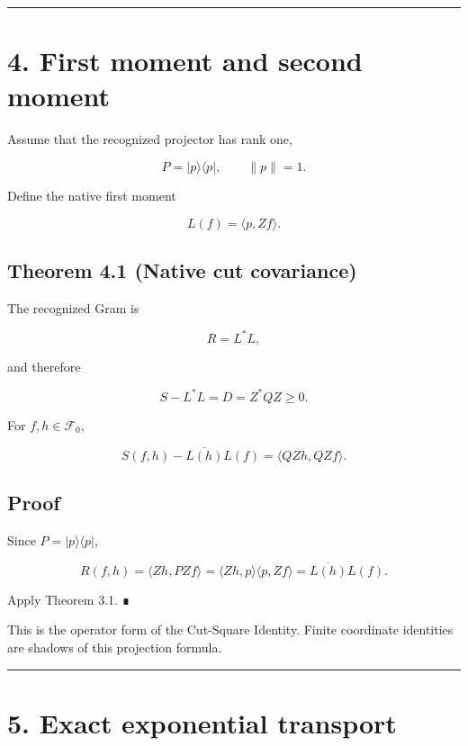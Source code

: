 \begin{center}\rule{0.5\linewidth}{0.5pt}\end{center}

\hypertarget{first-moment-and-second-moment}{%
\section{4. First moment and second moment}\label{first-moment-and-second-moment}}

Assume that the recognized projector has rank one,

\[
P=|p\rangle\langle p|,
\qquad
\|p\|=1.
\]

Define the native first moment

\[
L(f)=\langle p,Zf\rangle.
\]

\hypertarget{theorem-4.1-native-cut-covariance}{%
\subsection{Theorem 4.1 (Native cut covariance)}\label{theorem-4.1-native-cut-covariance}}

The recognized Gram is

\[
R=L^*L,
\]

and therefore

\[
\boxed{S-L^*L=D=Z^*QZ\ge0.}
\]

For \(f,h\in\mathcal F_0\),

\[
\boxed{
S(f,h)-\overline{L(h)}L(f)
=
\langle QZh,QZf\rangle.
}
\]

\hypertarget{proof-1}{%
\subsection{Proof}\label{proof-1}}

Since \(P=|p\rangle\langle p|\),

\[
R(f,h)
=
\langle Zh,PZf\rangle
=
\langle Zh,p\rangle\langle p,Zf\rangle
=
\overline{L(h)}L(f).
\]

Apply Theorem 3.1. ∎

This is the operator form of the Cut-Square Identity. Finite coordinate
identities are shadows of this projection formula.

\begin{center}\rule{0.5\linewidth}{0.5pt}\end{center}

\hypertarget{exact-exponential-transport}{%
\section{5. Exact exponential transport}\label{exact-exponential-transport}}

